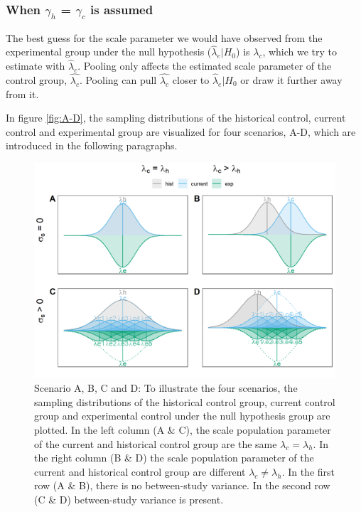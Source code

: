 \documentclass[Royal,sagev,times]{sagej}
\begin{document}
\subsubsection{When $\gamma_{h}$ = $\gamma_{c}$ is assumed}
The best guess for the scale parameter we would have observed from the experimental group under the null hypothesis ($\hat{\lambda}_e|H_0$) is $\lambda_c$, which we try to estimate with $\hat{\lambda}_c$. Pooling only affects the estimated scale parameter of the control group, $\hat{\lambda_c}$. Pooling can pull $\hat{\lambda_c}$ closer to $\hat{\lambda}_e|H_0$ or draw it further away from it. 

In figure \ref{fig:A-D}, the sampling distributions of the historical control, current control and experimental group are visualized for four scenarios, A-D, which are introduced in the following paragraphs.\\

\begin{figure}[H]
\includegraphics[width=12cm]{ScenarioABCD.png}
  \caption{Scenario A, B, C and D: To illustrate the four scenarios, the sampling distributions of the historical control group, current control group and experimental control under the null hypothesis group are plotted. In the left column (A \& C), the scale population parameter of the current and historical control group are the same $\lambda_c = \lambda_{h}$. In the right column (B \& D) the scale population parameter of the current and historical control group are different $\lambda_c \neq \lambda_{h}$. In the first row (A \& B), there is no between-study variance. In the second row (C \& D) between-study variance is present.}
  \label{fig:1}
\end{figure}
\end{document}
